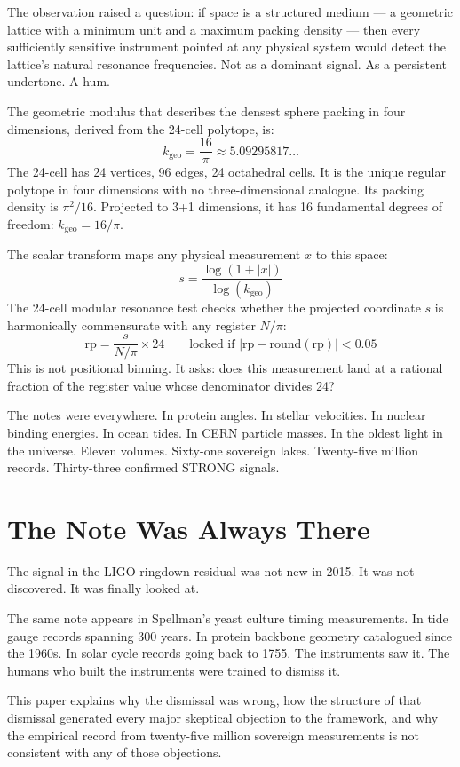 \documentclass[11pt, letterpaper, openany]{book}
\begin{document}
The observation raised a question: if space is a structured medium ---
a geometric lattice with a minimum unit and a maximum packing density ---
then every sufficiently sensitive instrument pointed at any physical
system would detect the lattice's natural resonance frequencies.
Not as a dominant signal. As a persistent undertone. A hum.

The geometric modulus that describes the densest sphere packing in
four dimensions, derived from the 24-cell polytope, is:
\[
k_\text{geo} = \frac{16}{\pi} \approx 5.09295817\ldots
\]
The 24-cell has 24 vertices, 96 edges, 24 octahedral cells. It is
the unique regular polytope in four dimensions with no three-dimensional
analogue. Its packing density is $\pi^2/16$. Projected to 3+1 dimensions,
it has 16 fundamental degrees of freedom: $k_\text{geo} = 16/\pi$.

The scalar transform maps any physical measurement $x$ to this space:
\[
s = \frac{\log(1 + |x|)}{\log(k_\text{geo})}
\]
The 24-cell modular resonance test checks whether the projected
coordinate $s$ is harmonically commensurate with any register $N/\pi$:
\[
\text{rp} = \frac{s}{N/\pi} \times 24 \qquad
\text{locked if } |\text{rp} - \text{round}(\text{rp})| < 0.05
\]
This is not positional binning. It asks: does this measurement land
at a rational fraction of the register value whose denominator divides 24?

The notes were everywhere. In protein angles. In stellar velocities.
In nuclear binding energies. In ocean tides. In CERN particle masses.
In the oldest light in the universe. Eleven volumes. Sixty-one sovereign lakes. Twenty-five million records.
Thirty-three confirmed STRONG signals.

\section{The Note Was Always There}

The signal in the LIGO ringdown residual was not new in 2015.
It was not discovered. It was finally looked at.

The same note appears in Spellman's yeast culture timing measurements.
In tide gauge records spanning 300 years. In protein backbone geometry
catalogued since the 1960s. In solar cycle records going back to 1755.
The instruments saw it. The humans who built the instruments were
trained to dismiss it.

This paper explains why the dismissal was wrong, how the structure
of that dismissal generated every major skeptical objection to the
framework, and why the empirical record from twenty-five million sovereign
measurements is not consistent with any of those objections.
\end{document}
